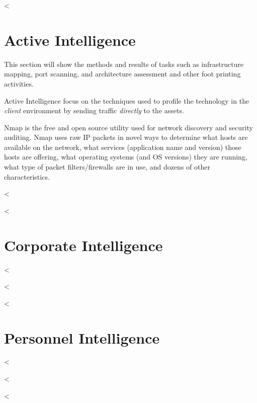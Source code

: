   <%

  \section {Active Intelligence}\label{sec:activeint}

    This section will show the methods and results of tasks such as
    infrastructure mapping, port scanning, and architecture assessment and other
    foot printing activities.

    Active Intelligence focus on the techniques used to profile the technology
    in the \textit{client} environment by sending traffic \textit{directly} to
    the assets.

    Nmap is the free and open source utility used for network discovery and
    security auditing. Nmap uses raw IP packets in novel ways to determine what
    hosts are available on the network, what services (application name and
    version) those hosts are offering, what operating systems (and OS versions)
    they are running, what type of packet filters/firewalls are in use, and
    dozens of other characteristics.

    \begin{itemize}
      <%
        \item \textbf{<%
          \begin{verbatim}
<%= port_scan[:result] %>
          \end{verbatim}
      <%
    \end{itemize}

  <%

  <%

  \section {Corporate Intelligence}\label{sec:corporateint}

    <%

  <%

  <%

  \section {Personnel Intelligence}\label{sec:personnelint}

    <%

  <%


<%
